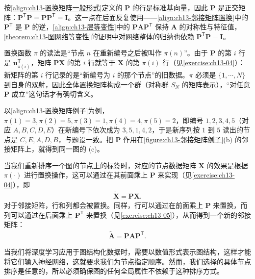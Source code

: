 \documentclass[../../main.tex]{subfiles}
\begin{document}
\begin{remark}
按\eqref{align:ch13-置换矩阵一般形式}定义的 $\bm{P}$ 的行是标准基向量，因此 $\bm{P}$ 是正交矩阵：$\bm{P}^{\mathsf T}\bm{P}=\bm{P}\bm{P}^{\mathsf T}=\bm{I}$。这一点在后面反复使用——\eqref{align:ch13-邻接矩阵置换}中的 $\bm{P}^{\mathsf T}$ 是 $\bm{P}$ 的逆，\eqref{align:ch13-层等变性}中的 $\bm{P}\bm{A}\bm{P}^{\mathsf T}$ 保持 $\bm{A}$ 的对称性与特征值，\cref{theorem:ch13-图网络等变性}的证明中对网络整体的归纳也依赖 $\bm{P}^{\mathsf T}\bm{P}=\bm{I}$。\par
置换函数 $\pi$ 的读法是“节点 $n$ 在重新编号之后被叫作 $\pi(n)$”。由于 $\bm{P}$ 的第 $i$ 行是 $\bm{u}_{\pi(i)}^{\mathsf T}$，矩阵 $\bm{P}\bm{X}$ 的第 $i$ 行就等于 $\bm{X}$ 的第 $\pi(i)$ 行（见\cref{exercise:ch13-04}）：新矩阵的第 $i$ 行记录的是“新编号为 $i$ 的那个节点”的旧数据。$\pi$ 必须是 $\{1,\cdots,N\}$ 到自身的双射，因此全体置换矩阵构成一个群（对称群 $S_N$ 的矩阵表示），“对任意 $\bm{P}$ 成立”这句话才有确切含义。\par
以\eqref{align:ch13-置换矩阵例子}为例，$\pi(1)=3,\pi(2)=5,\pi(3)=1,\pi(4)=4,\pi(5)=2$，即编号 $1,2,3,4,5$（对应 $A,B,C,D,E$）在新编号下依次成为 $3,5,1,4,2$，于是新序列按 $1$ 到 $5$ 读出的节点是 $C,E,A,D,B$，与题设一致。把 $\bm{P}$ 作用在\cref{figure:ch13-邻接矩阵例子}(b) 的邻接矩阵上，就得到同一图的 (c)。
\end{remark}

当我们重新排序一个图的节点上的标签时，对应的节点数据矩阵 $\bm{X}$ 的效果是根据 $\pi(\cdot)$ 进行置换操作，这可以通过在其前面乘上 $\bm{P}$ 来实现（见\cref{exercise:ch13-04}），即
\begin{align}
\widetilde{\bm{X}}=\bm{P}\bm{X}.
\label{align:ch13-数据矩阵置换}
\end{align}
对于邻接矩阵，行和列都会被置换。同样，行可以通过在前面乘上 $\bm{P}$ 来置换，而列可以通过在后面乘上 $\bm{P}^{\mathsf T}$ 来置换（见\cref{exercise:ch13-05}），从而得到一个新的邻接矩阵：
\begin{align}
\widetilde{\bm{A}}=\bm{P}\bm{A}\bm{P}^{\mathsf T}.
\label{align:ch13-邻接矩阵置换}
\end{align}

当我们将深度学习应用于图结构化数据时，需要以数值形式表示图结构，这样才能将它们输入神经网络，这就要求我们为节点指定顺序。然而，我们选择的具体节点排序是任意的，所以必须确保图的任何全局属性不依赖于这种排序方式。
\end{document}
